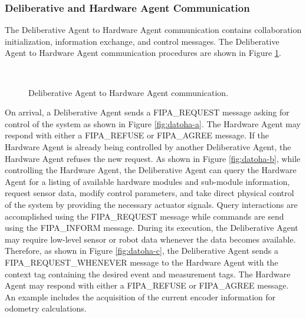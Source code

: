     \subsubsection{Deliberative and Hardware Agent Communication}
      The Deliberative Agent to Hardware Agent communication contains 
        collaboration initialization, information exchange, and control 
        messages.
      The Deliberative Agent to Hardware Agent communication procedures are 
        shown in Figure \ref{fig:datoha}.
      \begin{figure}%
      \begin{center}
        \hspace{.5in}
        \\
      \end{center}
      \caption{Deliberative Agent to Hardware Agent communication.}
      \label{fig:datoha}
      \end{figure}
      On arrival, a Deliberative Agent sends a FIPA\_REQUEST message asking for
        control of the system as shown in Figure \ref{fig:datoha-a}.
      The Hardware Agent may respond with either a FIPA\_REFUSE or FIPA\_AGREE 
        message.
      If the Hardware Agent is already being controlled by another Deliberative 
        Agent, the Hardware Agent refuses the new request.
      As shown in Figure \ref{fig:datoha-b}, while controlling the Hardware Agent, 
        the Deliberative Agent can query the Hardware Agent for a listing of 
        available hardware modules and sub-module information, request sensor 
        data, modify control parameters, and take direct physical control of 
        the system by providing the necessary actuator signals.
      Query interactions are accomplished using the FIPA\_REQUEST message
        while commands are send using the FIPA\_INFORM message.
      During its execution, the Deliberative Agent may require low-level sensor 
        or robot data whenever the data becomes available.
      Therefore, as shown in Figure \ref{fig:datoha-c}, the Deliberative Agent sends a 
        FIPA\_REQUEST\_WHENEVER message to the Hardware Agent with the context 
        tag containing the desired event and measurement tags.
      The Hardware Agent may respond with either a FIPA\_REFUSE or FIPA\_AGREE 
        message.
      An example includes the acquisition of the current encoder information 
        for odometry calculations.

